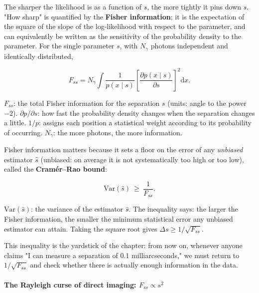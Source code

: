 The sharper the likelihood is as a function of $s$, the more tightly it pins down $s$. "How sharp" is quantified by the \textbf{Fisher information}; it is the expectation of the square of the slope of the log-likelihood with respect to the parameter, and can equivalently be written as the sensitivity of the probability density to the parameter. For the single parameter $s$, with $N_\gamma$ photons independent and identically distributed,

\begin{equation}
  F_{ss}=N_\gamma\int
  \frac{1}{p(x\mid s)}
  \left[\frac{\partial p(x\mid s)}{\partial s}\right]^{2}\mathrm{d}x.
  \label{eq:e12-fisher-def}
\end{equation}
\begin{formulaexplain}
$F_{ss}$: the total Fisher information for the separation $s$ (units: angle to the power $-2$). $\partial p/\partial s$: how fast the probability density changes when the separation changes a little. $1/p$: assigns each position a statistical weight according to its probability of occurring. $N_\gamma$: the more photons, the more information.
\end{formulaexplain}

Fisher information matters because it sets a floor on the error of any \emph{unbiased} estimator $\hat s$ (unbiased: on average it is not systematically too high or too low), called the \textbf{Cramér--Rao bound}:

\begin{equation}
  \mathrm{Var}(\hat s)\ \ge\ \frac{1}{F_{ss}}.
  \label{eq:e12-crb}
\end{equation}
\begin{formulaexplain}
$\mathrm{Var}(\hat s)$: the variance of the estimator $\hat s$. The inequality says: the larger the Fisher information, the smaller the minimum statistical error any unbiased estimator can attain. Taking the square root gives $\Delta s\ge 1/\sqrt{F_{ss}}$.
\end{formulaexplain}

This inequality is the yardstick of the chapter: from now on, whenever anyone claims "I can measure a separation of 0.1 milliarcseconds," we must return to $1/\sqrt{F_{ss}}$ and check whether there is actually enough information in the data.

\paragraph{The Rayleigh curse of direct imaging: \texorpdfstring{$F_{ss}\propto s^{2}$}{Fss proportional to s squared}}
\label{sec:e12-curse}

